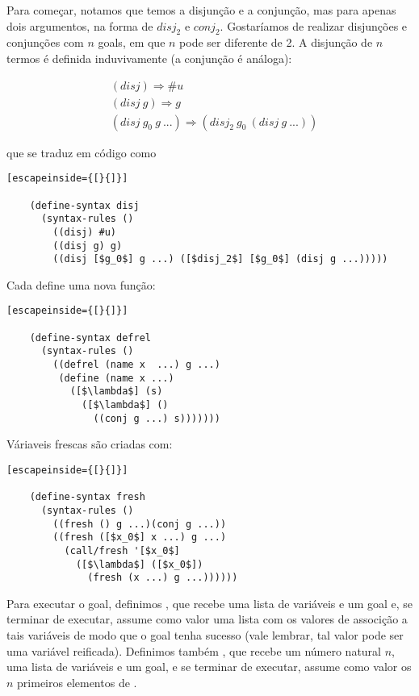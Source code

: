   Para começar, notamos que temos a disjunção e a conjunção, mas para
  apenas dois argumentos, na forma de  $disj_2$ e $conj_2$. Gostaríamos
  de realizar disjunções e conjunções com $n$ goals, em que $n$ pode
  ser diferente de 2. A disjunção de $n$ termos é definida
  induvivamente (a conjunção é análoga):

  \begin{align*}
    &(disj) \Rightarrow \#u \\
    &(disj\ g) \Rightarrow g \\
    &(disj\ g_0\ g\ ...) \Rightarrow (disj_2\ g_0\ (disj\ g\ ...))
  \end{align*}

  \noindent que se traduz em código como

  \begin{lstlisting}[escapeinside={[}{]}]

    (define-syntax disj
      (syntax-rules ()
        ((disj) #u)
        ((disj g) g)
        ((disj [$g_0$] g ...) ([$disj_2$] [$g_0$] (disj g ...)))))

  \end{lstlisting}

  Cada  define uma nova função:

  \begin{lstlisting}[escapeinside={[}{]}]

    (define-syntax defrel
      (syntax-rules ()
        ((defrel (name x  ...) g ...)
         (define (name x ...)
           ([$\lambda$] (s)
             ([$\lambda$] ()
               ((conj g ...) s)))))))

  \end{lstlisting}
             
  Váriaveis frescas são criadas com:

  \begin{lstlisting}[escapeinside={[}{]}]

    (define-syntax fresh
      (syntax-rules ()
        ((fresh () g ...)(conj g ...))
        ((fresh ([$x_0$] x ...) g ...)
          (call/fresh '[$x_0$]
            ([$\lambda$] ([$x_0$])
              (fresh (x ...) g ...))))))

  \end{lstlisting}
  
  Para executar o goal, definimos , que recebe uma
  lista de variáveis e um goal e, se terminar de executar, assume como
  valor uma lista com os valores de associção a tais variáveis de modo
  que o goal tenha sucesso (vale lembrar, tal valor pode ser uma
  variável reificada). Definimos também , que recebe
  um número natural $n$, uma lista de variáveis e um goal, e se
  terminar de executar, assume como valor os $n$ primeiros elementos
  de .

